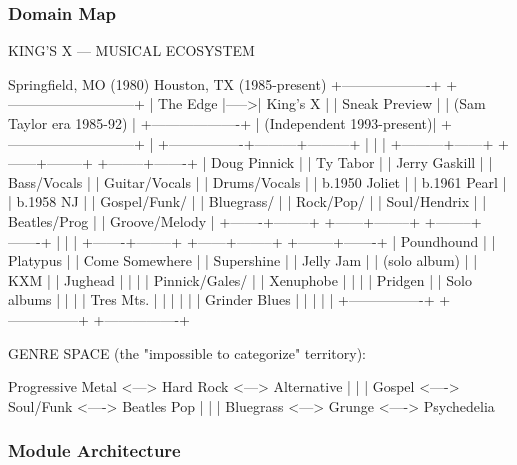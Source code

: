 \documentclass[11pt,letterpaper]{article}
\begin{document}
\subsubsection{Domain Map}

\begin{asciibox}
KING'S X --- MUSICAL ECOSYSTEM

  Springfield, MO (1980)     Houston, TX (1985-present)
  +-------------------+      +---------------------------+
  | The Edge          |----->| King's X                  |
  | Sneak Preview     |      | (Sam Taylor era 1985-92)  |
  +-------------------+      | (Independent 1993-present)|
                              +---------------------------+
                                         |
              +----------------+---------+---------+
              |                |                   |
    +---------+------+ +------+--------+ +--------+-------+
    | Doug Pinnick   | | Ty Tabor      | | Jerry Gaskill  |
    | Bass/Vocals    | | Guitar/Vocals | | Drums/Vocals   |
    | b.1950 Joliet  | | b.1961 Pearl  | | b.1958 NJ      |
    | Gospel/Funk/   | | Bluegrass/    | | Rock/Pop/      |
    | Soul/Hendrix   | | Beatles/Prog  | | Groove/Melody  |
    +-------+--------+ +------+--------+ +--------+-------+
            |                  |                   |
    +-------+--------+ +------+--------+ +--------+-------+
    | Poundhound     | | Platypus      | | Come Somewhere |
    | Supershine     | | Jelly Jam     | | (solo album)   |
    | KXM            | | Jughead       | |                |
    | Pinnick/Gales/ | | Xenuphobe     | |                |
    | Pridgen        | | Solo albums   | |                |
    | Tres Mts.      | |               | |                |
    | Grinder Blues  | |               | |                |
    +----------------+ +---------------+ +----------------+

  GENRE SPACE (the "impossible to categorize" territory):

    Progressive Metal <---> Hard Rock <---> Alternative
           |                    |                |
         Gospel <----> Soul/Funk <----> Beatles Pop
           |                    |                |
       Bluegrass <---> Grunge <----> Psychedelia
\end{asciibox}

\subsubsection{Module Architecture}
\end{document}
